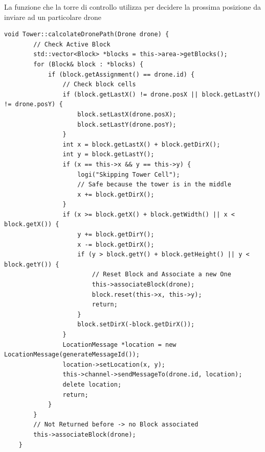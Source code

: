 \documentclass[a4paper, 11pt]{article}
\begin{document}
La funzione che la torre di controllo utilizza per decidere la prossima posizione da inviare ad un particolare drone
\begin{lstlisting}[style=customcpp, caption={da tower.cpp}]
    void Tower::calcolateDronePath(Drone drone) {
        // Check Active Block
        std::vector<Block> *blocks = this->area->getBlocks();
        for (Block& block : *blocks) {
            if (block.getAssignment() == drone.id) {
                // Check block cells
                if (block.getLastX() != drone.posX || block.getLastY() != drone.posY) {
                    block.setLastX(drone.posX);
                    block.setLastY(drone.posY);
                }
                int x = block.getLastX() + block.getDirX();
                int y = block.getLastY();
                if (x == this->x && y == this->y) {
                    logi("Skipping Tower Cell");
                    // Safe because the tower is in the middle
                    x += block.getDirX();
                }
                if (x >= block.getX() + block.getWidth() || x < block.getX()) {
                    y += block.getDirY();
                    x -= block.getDirX();
                    if (y > block.getY() + block.getHeight() || y < block.getY()) {
                        // Reset Block and Associate a new One
                        this->associateBlock(drone);
                        block.reset(this->x, this->y);
                        return;
                    }
                    block.setDirX(-block.getDirX());
                }
                LocationMessage *location = new LocationMessage(generateMessageId());
                location->setLocation(x, y);
                this->channel->sendMessageTo(drone.id, location);
                delete location; 
                return;
            }
        }
        // Not Returned before -> no Block associated
        this->associateBlock(drone);
    }
\end{lstlisting}
\end{document}
